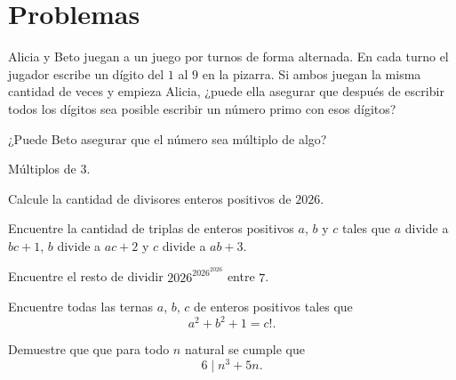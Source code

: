 \section{Problemas}
\begin{problem}
Alicia y Beto juegan a un juego
por turnos de forma alternada.
En cada turno el jugador
escribe un dígito del $1$
al $9$ en la pizarra.
Si ambos juegan la misma cantidad de veces
y empieza Alicia,
¿puede ella asegurar que después
de escribir todos los dígitos
sea posible escribir un número primo
con esos dígitos?

\begin{hints}
	\begin{hint}
		¿Puede Beto asegurar que el número sea
		múltiplo de algo?
	\end{hint}

	\begin{hint}
		Múltiplos de $3$.
	\end{hint}
\end{hints}
\end{problem}

\begin{problem}
Calcule la cantidad de divisores enteros positivos de $2026$.
\end{problem}


\begin{problem}
Encuentre la cantidad de triplas de enteros positivos $a$, $b$ y $c$ tales que $a$ divide a $bc + 1$, $b$ divide
a $ac + 2$ y $c$ divide a $ab + 3$.
\end{problem}

\begin{problem}
Encuentre el resto de dividir $2026^{2026^{2026}}$ entre $7$.
\end{problem}

\begin{problem}
Encuentre todas las ternas $a$, $b$, $c$ de enteros positivos
tales que
\[a^2 + b^2 + 1 = c!.\]
\end{problem}

\begin{problem}
Demuestre que que para todo $n$ natural se cumple que
\[6 \mid n^3 + 5n.\]
\end{problem}


